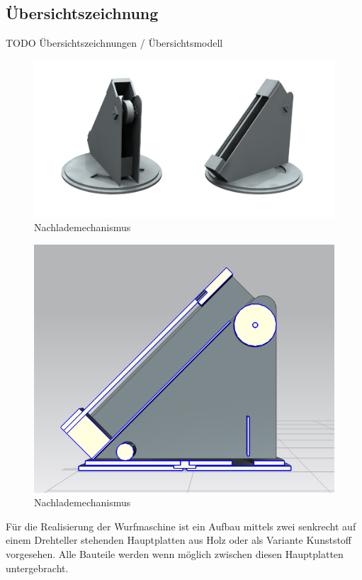 \subsection{Übersichtszeichnung}
TODO Übersichtszeichnungen / Übersichtsmodell

\begin{figure}[h!]
	\centering
	\includegraphics[scale=0.5]{../../fig/Studio.png}
	\caption{Nachlademechanismus}
\end{figure}
\begin{figure}[h!]
	\centering
	\includegraphics[scale=0.5]{../../fig/Schnittansicht.png}
	\caption{Nachlademechanismus}
\end{figure}
Für die Realisierung der Wurfmaschine ist ein Aufbau mittels zwei senkrecht auf einem Drehteller stehenden Hauptplatten aus Holz oder als Variante Kunststoff vorgesehen. Alle Bauteile werden wenn möglich zwischen diesen Hauptplatten untergebracht.
